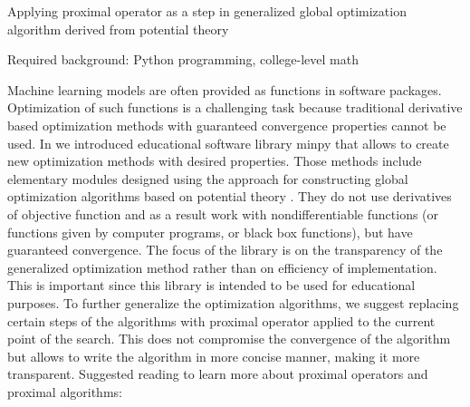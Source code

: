 Applying proximal operator as a step in generalized global optimization algorithm derived from potential theory


Required background: Python programming, college-level math

Machine learning models are often provided as functions in software packages. Optimization of such functions is a challenging task because traditional derivative based optimization methods with guaranteed convergence properties cannot be used. In \cite{MP} we introduced educational software library minpy that allows to create new optimization methods with desired properties. Those methods include elementary modules designed using the approach for constructing global optimization algorithms based on potential theory \cite{KAP1,KAP2}. They do not use derivatives of objective function and as a result work with nondifferentiable functions (or functions given by computer programs, or black box functions), but have guaranteed convergence. The focus of the library is on the transparency of the generalized optimization method rather than on efficiency of implementation. This is important since this library is intended to be used for educational purposes. To further generalize the optimization algorithms, we suggest replacing certain steps of the algorithms with proximal operator applied to the current point of the search. This does not compromise the convergence of the algorithm  \cite{KAP3}  but allows to write the algorithm in more concise manner, making it more transparent. Suggested reading to learn more about proximal operators and proximal algorithms: \cite{LAKLG,RGMN,SGFLZ}



